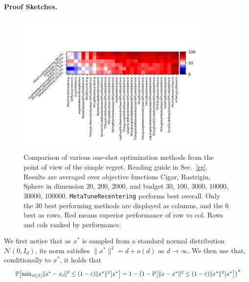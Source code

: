 \textbf{Proof Sketches.} 
\begin{figure}[t]
    \centering
    \includegraphics[trim={10 25 12 80}, clip,width=0.85\textwidth]{sections/appendix/ppsn2020-rescaling/figures/newnewnewdoe.png}
    \caption{Comparison of various one-shot optimization methods from the point of view of the simple regret. Reading guide in Sec.~\ref{rg}. Results are averaged over objective functions Cigar, Rastrigin, Sphere in dimension $20$, $200$, $2000$, and budget $30$, $100$, $3000$, $10000$, $30000$, $100000$. {\texttt{MetaTuneRecentering} performs best overall. Only the 30 best performing methods are displayed as columns, and the 6 best as rows. Red means superior performance of row vs col. Rows and cols ranked by performance.}}
    \label{doexp}
\end{figure}
\label{sketch}
We first notice that as $x^*$ is sampled from a standard normal distribution $\mathcal{N}(0,I_d)$, its norm satisfies $\lVert x^*\rVert^2  = d + o(d)$ as $d\rightarrow\infty$. 
We then use that, conditionally to $x^*$, it holds that 
\begin{equation*}
\resizebox{.99\hsize}{!}{ $\mathbb{P}\left[\min_{i\in[\lambda]}\lVert x^*-x_i\rVert^2 \leq \left(1-\varepsilon\right)\lVert x^*\rVert^2\big| x^*\right]  
=1-\left(1-\mathbb{P}\left[\lVert x-x^*\rVert^2 \leq \left(1-\varepsilon\right)\lVert x^*\rVert^2\big|x^*\right]\right)^\lambda$}
\end{equation*}
